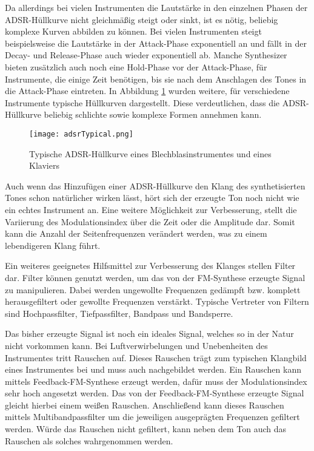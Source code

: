 Da allerdings bei vielen Instrumenten die Lautstärke in den einzelnen Phasen der ADSR-Hüllkurve nicht gleichmäßig steigt oder sinkt, ist es nötig, beliebig komplexe Kurven abbilden zu können. Bei vielen Instrumenten steigt beispielsweise die Lautstärke in der Attack-Phase exponentiell an und fällt in der Decay- und Release-Phase auch wieder exponentiell ab. Manche Synthesizer bieten zusätzlich auch noch eine Hold-Phase vor der Attack-Phase, für Instrumente, die einige Zeit benötigen, bis sie nach dem Anschlagen des Tones in die Attack-Phase eintreten. In Abbildung \ref{fig:adsrTypical} wurden weitere, für verschiedene Instrumente typische Hüllkurven dargestellt. Diese verdeutlichen, dass die ADSR-Hüllkurve beliebig schlichte sowie komplexe Formen annehmen kann.

\begin{figure} [ht]
\centering
  \texttt{[image: adsrTypical.png]}
\caption{Typische ADSR-Hüllkurve eines Blechblasinstrumentes \cite{chowningPaper} und eines Klaviers}
\label{fig:adsrTypical} 
\end{figure}

Auch wenn das Hinzufügen einer ADSR-Hüllkurve den Klang des synthetisierten Tones schon natürlicher wirken lässt, hört sich der erzeugte Ton noch nicht wie ein echtes Instrument an. Eine weitere Möglichkeit zur Verbesserung, stellt die Variierung des Modulationsindex über die Zeit oder die Amplitude dar. Somit kann die Anzahl der Seitenfrequenzen verändert werden, was zu einem lebendigeren Klang führt. \cite[S. 532]{chowningPaper}

Ein weiteres geeignetes Hilfsmittel zur Verbesserung des Klanges stellen Filter dar. Filter können genutzt werden, um das von der FM-Synthese erzeugte Signal zu manipulieren. Dabei werden ungewollte Frequenzen gedämpft bzw. komplett herausgefiltert oder gewollte Frequenzen verstärkt. Typische Vertreter von Filtern sind Hochpassfilter, Tiefpassfilter, Bandpass und Bandsperre. \cite[S. 100-104]{stotz}

Das bisher erzeugte Signal ist noch ein ideales Signal, welches so in der Natur nicht vorkommen kann. Bei Luftverwirbelungen und Unebenheiten des Instrumentes tritt Rauschen auf. Dieses Rauschen trägt zum typischen Klangbild eines Instrumentes bei und muss auch nachgebildet werden. Ein Rauschen kann mittels Feedback-FM-Synthese erzeugt werden, dafür muss der Modulationsindex sehr hoch angesetzt werden. Das von der Feedback-FM-Synthese erzeugte Signal gleicht hierbei einem weißen Rauschen. Anschließend kann dieses Rauschen mittels Multibandpassfilter um die jeweiligen ausgeprägten Frequenzen gefiltert werden. Würde das Rauschen nicht gefiltert, kann neben dem Ton auch das Rauschen als solches wahrgenommen werden. \cite[S. 152]{barkowsky}

